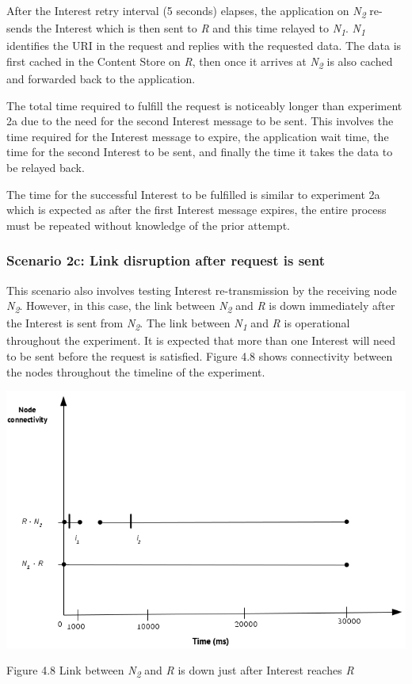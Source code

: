 \documentclass[a4paper,12pt]{report}      %
\begin{document}
After the Interest retry interval (5 seconds) elapses, the application on \emph{N\textsubscript{2}} re-sends the Interest
which is then sent to \emph{R} and this time relayed to \emph{N\textsubscript{1}}. \emph{N\textsubscript{1}} 
identifies the URI in the request and replies with the requested data. The data is first cached in the 
Content Store on \emph{R}, then once it arrives at \emph{N\textsubscript{2}} is also cached and forwarded back to the application.

The total time required to fulfill the request is noticeably longer than experiment 2a due to the need for
the second Interest message to be sent. This involves the time required for the Interest message to
expire, the application wait time, the time for the second Interest to be sent, and finally the time it takes
the data to be relayed back.

The time for the successful Interest to be fulfilled is similar to experiment 2a which is expected as after
the first Interest message expires, the entire process must be repeated without knowledge of the prior
attempt. %

\subsubsection{Scenario 2c: Link disruption after request is sent}

This scenario also involves testing Interest re-transmission by the receiving node \emph{N\textsubscript{2}}. However, in
this case, the link between \emph{N\textsubscript{2}} and \emph{R} is down immediately after the Interest is sent
from \emph{N\textsubscript{2}}. The link between \emph{N\textsubscript{1}} and \emph{R} is operational throughout the experiment. It is expected that more than one Interest will need to be sent before the request is satisfied. Figure 4.8 shows connectivity between the nodes throughout the timeline of the experiment.

\noindent\includegraphics[scale=0.55]{exp2c_timediag.jpg}\newline
\begin{center}Figure 4.8 Link between \emph{N\textsubscript{2}} and \emph{R} is down just after Interest reaches \emph{R}\end{center}
\end{document}

